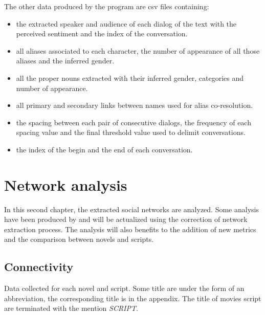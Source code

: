 \documentclass[a4paper, 12pt]{report}
\begin{document}
The other data produced by the program are csv files containing:
\begin{itemize}
\item the extracted speaker and audience of each dialog of the text with the perceived sentiment and the index of the conversation.
\item all aliases associated to each character, the number of appearance of all those aliases and the inferred gender.
\item all the proper nouns extracted with their inferred gender, categories and number of appearance.
\item all primary and secondary links between names used for alias co-resolution.
\item the spacing between each pair of consecutive dialogs, the frequency of each spacing value and the final threshold value used to delimit conversations.
\item the index of the begin and the end of each conversation.
\end{itemize}



\chapter{Network analysis}
In this second chapter, the extracted social networks are analyzed. Some analysis have been produced by \cite{original} and will be actualized using the correction of network extraction process. The analysis will also benefits to the addition of new metrics and the comparison between novels and scripts.


\section{Connectivity}

\begin{table}[]
\caption{Data collected for each novel and script. Some title are under the form of an abbreviation, the corresponding title
 is in the appendix. The title of movies script are terminated with the mention \textit{SCRIPT}.}
 \label{signature}
\end{table}
\end{document}
